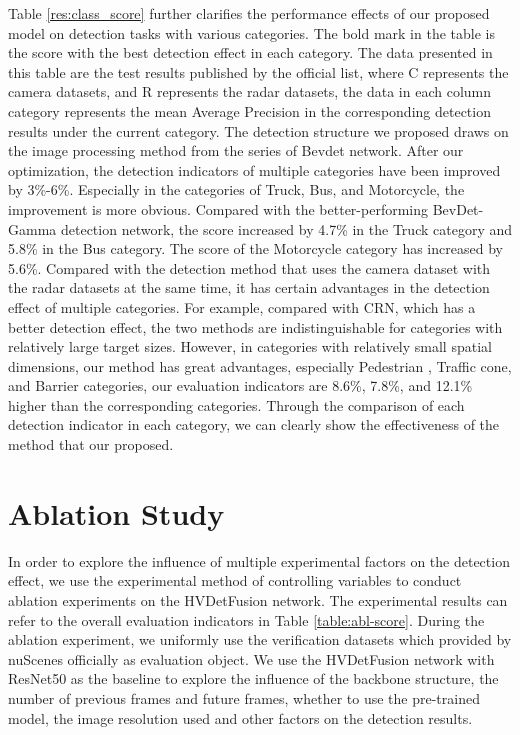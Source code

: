 \documentclass[10pt,twocolumn,letterpaper]{article}
\begin{document}
Table \ref{res:class_score} further clarifies the performance effects of our proposed model on detection tasks with various categories. The bold mark in the table is the score with the best detection effect in each category. The data presented in this table are the test results published by the official list, where C represents the camera datasets, and R represents the radar datasets, the data in each column category represents the mean Average Precision in the corresponding detection results under the current category. The detection structure we proposed draws on the image processing method from the series of Bevdet network. After our optimization, the detection indicators of multiple categories have been improved by 3\%-6\%. Especially in the categories of Truck, Bus, and Motorcycle, the improvement is more obvious. Compared with the better-performing BevDet-Gamma detection network, the score increased by 4.7\% in the Truck category and 5.8\% in the Bus category.
The score of the Motorcycle category has increased by 5.6\%. Compared with the detection method that uses the camera dataset with the radar datasets at the same time, it has certain advantages in the detection effect of multiple categories. For example, compared with CRN, which has a better detection effect, the two methods are indistinguishable for categories with relatively large target sizes. However, in categories with relatively small spatial dimensions, our method has great advantages, especially Pedestrian , Traffic cone, and Barrier categories, our evaluation indicators are 8.6\%, 7.8\%, and 12.1\% higher than the corresponding categories. Through the comparison of each detection indicator in each category, we can clearly show the effectiveness of the method that our proposed.

   
\section{Ablation Study}
   In order to explore the influence of multiple experimental factors on the detection effect, we use the experimental method of controlling variables to conduct ablation experiments on the HVDetFusion network. The experimental results can refer to the overall evaluation indicators in Table \ref{table:abl-score}. During the ablation experiment, we uniformly use the verification datasets which provided by nuScenes officially as evaluation object. We use the HVDetFusion network with ResNet50 as the baseline to explore the influence of the backbone structure, the number of previous frames and future frames, whether to use the pre-trained model, the image resolution used and other factors on the detection results. 
\end{document}
